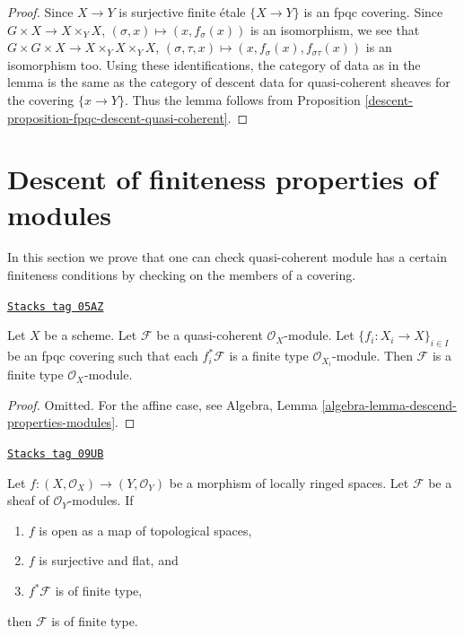 \begin{proof}

Since $X \to Y$ is surjective finite \'etale $\{X \to Y\}$ is
an fpqc covering. Since
$G \times X \to X \times_Y X$, $(\sigma, x) \mapsto (x, f_\sigma(x))$
is an isomorphism, we see that
$G \times G \times X \to X \times_Y X \times_Y X$,
$(\sigma, \tau, x) \mapsto (x, f_\sigma(x), f_{\sigma\tau}(x))$
is an isomorphism too. Using these identifications, the category of
data as in the lemma is the same as the category of descent data
for quasi-coherent sheaves for the covering $\{x \to Y\}$.
Thus the lemma follows from
Proposition \ref{descent-proposition-fpqc-descent-quasi-coherent}.
\end{proof}

\section{Descent of finiteness properties of modules}
\label{descent-section-descent-finiteness}
In this section we prove that one can check quasi-coherent module
has a certain finiteness conditions by checking on the members of
a covering.

\begin{lemma}
\label{descent-lemma-finite-type-descends}
\href{https://stacks.math.columbia.edu/tag/05AZ}{\texttt{Stacks tag 05AZ}}

Let $X$ be a scheme.
Let $\mathcal{F}$ be a quasi-coherent $\mathcal{O}_X$-module.
Let $\{f_i : X_i \to X\}_{i \in I}$ be an fpqc covering such that
each $f_i^*\mathcal{F}$ is a finite type $\mathcal{O}_{X_i}$-module.
Then $\mathcal{F}$ is a finite type $\mathcal{O}_X$-module.
\end{lemma}

\begin{proof}
Omitted. For the affine case, see
Algebra, Lemma \ref{algebra-lemma-descend-properties-modules}.
\end{proof}

\begin{lemma}
\label{descent-lemma-finite-type-descends-fppf}
\href{https://stacks.math.columbia.edu/tag/09UB}{\texttt{Stacks tag 09UB}}

Let $f : (X, \mathcal{O}_X) \to (Y, \mathcal{O}_Y)$ be a morphism of
locally ringed spaces. Let $\mathcal{F}$ be a sheaf of $\mathcal{O}_Y$-modules.
If
\begin{enumerate}
\item $f$ is open as a map of topological spaces,
\item $f$ is surjective and flat, and
\item $f^*\mathcal{F}$ is of finite type,
\end{enumerate}
then $\mathcal{F}$ is of finite type.
\end{lemma}

